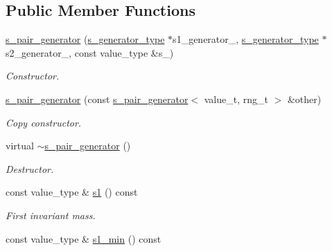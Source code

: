 \subsection*{Public Member Functions}
\begin{DoxyCompactItemize}
\item 
\hypertarget{a00495_ae888da058427437dadda56a6c303b8c4}{}\hyperlink{a00495_ae888da058427437dadda56a6c303b8c4}{s\+\_\+pair\+\_\+generator} (\hyperlink{a00577}{s\+\_\+generator\+\_\+type} $\ast$s1\+\_\+generator\+\_\+, \hyperlink{a00577}{s\+\_\+generator\+\_\+type} $\ast$s2\+\_\+generator\+\_\+, const value\+\_\+type \&s\+\_\+)\label{a00495_ae888da058427437dadda56a6c303b8c4}

\begin{DoxyCompactList}\small\item\em Constructor. \end{DoxyCompactList}\item 
\hypertarget{a00495_aa8a4ce276a896bbe6e71e6b9427d9520}{}\hyperlink{a00495_aa8a4ce276a896bbe6e71e6b9427d9520}{s\+\_\+pair\+\_\+generator} (const \hyperlink{a00495}{s\+\_\+pair\+\_\+generator}$<$ value\+\_\+t, rng\+\_\+t $>$ \&other)\label{a00495_aa8a4ce276a896bbe6e71e6b9427d9520}

\begin{DoxyCompactList}\small\item\em Copy constructor. \end{DoxyCompactList}\item 
\hypertarget{a00495_ae836e1a28251407201f229f3966ff9a0}{}virtual \hyperlink{a00495_ae836e1a28251407201f229f3966ff9a0}{$\sim$s\+\_\+pair\+\_\+generator} ()\label{a00495_ae836e1a28251407201f229f3966ff9a0}

\begin{DoxyCompactList}\small\item\em Destructor. \end{DoxyCompactList}\item 
\hypertarget{a00495_a6f248fad9af50b8273931eff66db2c5f}{}const value\+\_\+type \& \hyperlink{a00495_a6f248fad9af50b8273931eff66db2c5f}{s1} () const \label{a00495_a6f248fad9af50b8273931eff66db2c5f}

\begin{DoxyCompactList}\small\item\em First invariant mass. \end{DoxyCompactList}\item 
\hypertarget{a00495_af35800e4575fa176e0afa8596cabbf9e}{}const value\+\_\+type \& \hyperlink{a00495_af35800e4575fa176e0afa8596cabbf9e}{s1\+\_\+min} () const \label{a00495_af35800e4575fa176e0afa8596cabbf9e}


\end{DoxyCompactItemize}
